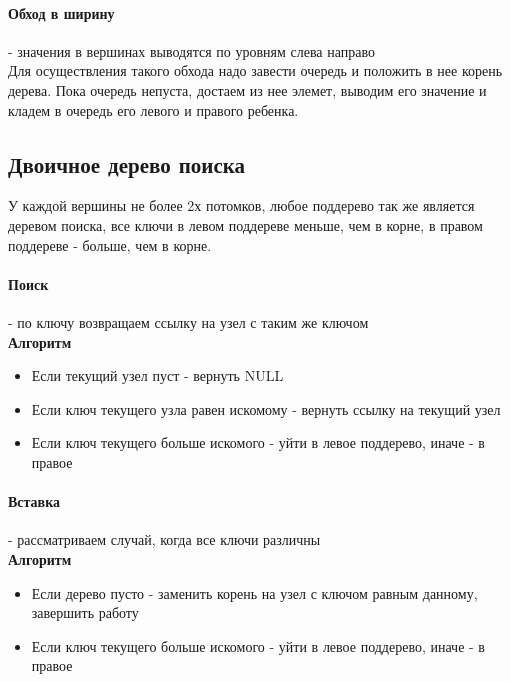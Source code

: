 \documentclass[a4paper,10pt]{article}
\begin{document}
\paragraph{Обход в ширину} - значения в вершинах выводятся по уровням слева направо\\
Для осуществления такого обхода надо завести очередь и положить в нее корень дерева. Пока очередь непуста, достаем из нее элемет, выводим его значение и кладем в очередь его левого и правого ребенка.
\subsection{Двоичное дерево поиска}
У каждой вершины не более 2х потомков, любое поддерево так же является деревом поиска, все ключи в левом поддереве меньше, чем в корне, в правом поддереве - больше, чем в корне. 
\paragraph{Поиск} - по ключу возвращаем ссылку на узел с таким же ключом\\
\textbf{Алгоритм} \\
\begin{itemize}
	\item Если текущий узел пуст - вернуть NULL
	\item Если ключ текущего узла равен искомому - вернуть ссылку на текущий узел 
	\item Если ключ текущего больше искомого - уйти в левое поддерево, иначе - в правое
\end{itemize}
\paragraph{Вставка} - рассматриваем случай, когда все ключи различны\\
\textbf{Алгоритм}\\
\begin{itemize}
	\item Если дерево пусто - заменить корень на узел с ключом равным данному, завершить работу
	\item Если ключ текущего больше искомого - уйти в левое поддерево, иначе - в правое
\end{itemize}
\end{document}
